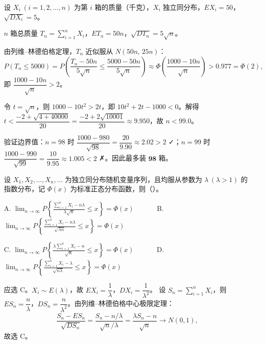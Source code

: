 \documentclass[lang=cn,11pt]{elegantbook}
\begin{document}
\begin{solution}
设 \(X_i\ (i=1,2,\dots,n)\) 为第 \(i\) 箱的质量（千克），\(X_i\) 独立同分布，\(EX_i = 50\)，\(\sqrt{DX_i} = 5\)。

\(n\) 箱总质量 \(T_n = \displaystyle\sum_{i=1}^{n} X_i\)，\(ET_n = 50n\)，\(\sqrt{DT_n} = 5\sqrt{n}\)。

由列维--林德伯格定理，\(T_n\) 近似服从 \(N(50n,\, 25n)\)：
\[
P(T_n \leq 5000) = P\!\left(\frac{T_n - 50n}{5\sqrt{n}} \leq \frac{5000 - 50n}{5\sqrt{n}}\right) \approx \Phi\!\left(\frac{1000 - 10n}{\sqrt{n}}\right) > 0.977 = \Phi(2),
\]
即 \(\dfrac{1000 - 10n}{\sqrt{n}} > 2\)。

令 \(t = \sqrt{n}\)，则 \(1000 - 10t^2 > 2t\)，即 \(10t^2 + 2t - 1000 < 0\)。解得 \(t < \dfrac{-2 + \sqrt{4+40000}}{20} = \dfrac{-2+2\sqrt{10001}}{20} \approx 9.950\)，故 \(n < 99.0\)。

验证边界值：\(n=98\) 时 \(\dfrac{1000-980}{\sqrt{98}} = \dfrac{20}{9.90} \approx 2.02 > 2\) ✓；\(n=99\) 时 \(\dfrac{1000-990}{\sqrt{99}} = \dfrac{10}{9.95} \approx 1.005 < 2\) ✗。因此最多装 \(\mathbf{98}\) 箱。
\end{solution}

\begin{exercise}\label{exer:5-clt-exp-norm}
设 \(X_1, X_2, \dots, X_n, \dots\) 为独立同分布随机变量序列，且均服从参数为 \(\lambda\ (\lambda > 1)\) 的指数分布，记 \(\Phi(x)\) 为标准正态分布函数，则（\quad）。\par
A. \(\displaystyle\lim_{n\to\infty} P\!\left\{\frac{\sum_{i=1}^n X_i - n\lambda}{\lambda\sqrt{n}} \leq x\right\} = \Phi(x)\)~~~~~~
B. \(\displaystyle\lim_{n\to\infty} P\!\left\{\frac{\sum_{i=1}^n X_i - n\lambda}{\sqrt{\lambda n}} \leq x\right\} = \Phi(x)\)\par
C. \(\displaystyle\lim_{n\to\infty} P\!\left\{\frac{\lambda\sum_{i=1}^n X_i - n}{\sqrt{n}} \leq x\right\} = \Phi(x)\)~~~~~~
D. \(\displaystyle\lim_{n\to\infty} P\!\left\{\frac{\sum_{i=1}^n X_i - \lambda}{\sqrt{n\lambda}} \leq x\right\} = \Phi(x)\)
\end{exercise}
\begin{solution}
应选 C。\(X_i \sim E(\lambda)\)，故 \(EX_i = \dfrac{1}{\lambda}\)，\(DX_i = \dfrac{1}{\lambda^2}\)。
设 \(S_n = \displaystyle\sum_{i=1}^{n} X_i\)，则 \(ES_n = \dfrac{n}{\lambda}\)，\(DS_n = \dfrac{n}{\lambda^2}\)。由列维--林德伯格中心极限定理：
\[
\frac{S_n - ES_n}{\sqrt{DS_n}} = \frac{S_n - n/\lambda}{\sqrt{n}/\lambda}
= \frac{\lambda S_n - n}{\sqrt{n}} \to N(0,1),
\]
故选 C。
\end{solution}
\end{document}
